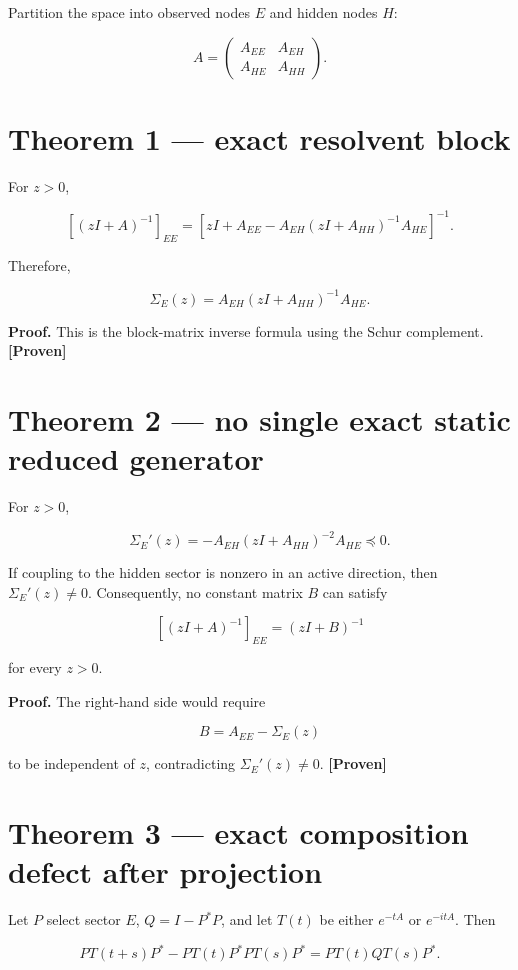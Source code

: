 \documentclass[11pt,a4paper,openany]{report}
\newcommand{\statusProven}{\textcolor{fingreen}{[Proven]}}
\begin{document}
Partition the space into observed nodes \(E\) and hidden nodes \(H\):

\[
A=
\begin{pmatrix}
A_{EE}&A_{EH}\\
A_{HE}&A_{HH}
\end{pmatrix}.
\]

\section{Theorem 1 --- exact resolvent block}

For \(z>0\),

\[
\left[(zI+A)^{-1}\right]_{EE}
=
\left[
zI+A_{EE}
-A_{EH}(zI+A_{HH})^{-1}A_{HE}
\right]^{-1}.
\]

Therefore,

\[
\Sigma_E(z)=A_{EH}(zI+A_{HH})^{-1}A_{HE}.
\]

\textbf{Proof.} This is the block-matrix inverse formula using the Schur complement. \textbf{\statusProven{}}

\section{Theorem 2 --- no single exact static reduced generator}

For \(z>0\),

\[
\Sigma_E'(z)
=
-A_{EH}(zI+A_{HH})^{-2}A_{HE}\preceq0.
\]

If coupling to the hidden sector is nonzero in an active direction, then \(\Sigma_E'(z)\neq0\). Consequently, no constant matrix \(B\) can satisfy

\[
\left[(zI+A)^{-1}\right]_{EE}=(zI+B)^{-1}
\]

for every \(z>0\).

\textbf{Proof.} The right-hand side would require

\[
B=A_{EE}-\Sigma_E(z)
\]

to be independent of \(z\), contradicting \(\Sigma_E'(z)\neq0\). \textbf{\statusProven{}}

\section{Theorem 3 --- exact composition defect after projection}

Let \(P\) select sector \(E\), \(Q=I-P^\ast P\), and let \(T(t)\) be either \(e^{-tA}\) or \(e^{-itA}\). Then

\[
PT(t+s)P^\ast
-PT(t)P^\ast PT(s)P^\ast
=
PT(t)QT(s)P^\ast.
\]
\end{document}
